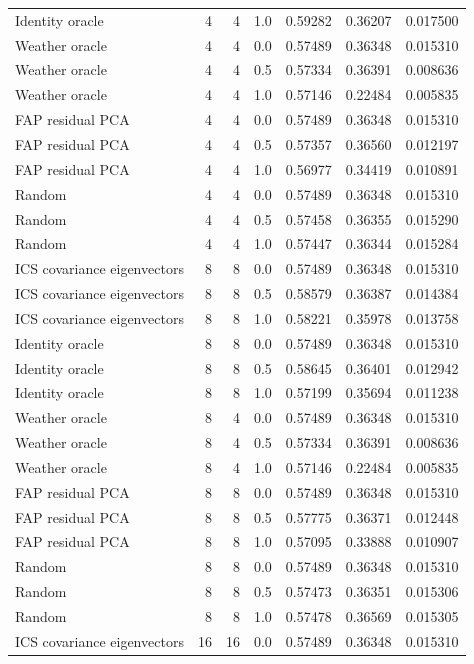 \begin{tabular}{lrrrrrr}
Identity oracle & 4 & 4 & 1.0 & 0.59282 & 0.36207 & 0.017500 \\
Weather oracle & 4 & 4 & 0.0 & 0.57489 & 0.36348 & 0.015310 \\
Weather oracle & 4 & 4 & 0.5 & 0.57334 & 0.36391 & 0.008636 \\
Weather oracle & 4 & 4 & 1.0 & 0.57146 & 0.22484 & 0.005835 \\
FAP residual PCA & 4 & 4 & 0.0 & 0.57489 & 0.36348 & 0.015310 \\
FAP residual PCA & 4 & 4 & 0.5 & 0.57357 & 0.36560 & 0.012197 \\
FAP residual PCA & 4 & 4 & 1.0 & 0.56977 & 0.34419 & 0.010891 \\
Random & 4 & 4 & 0.0 & 0.57489 & 0.36348 & 0.015310 \\
Random & 4 & 4 & 0.5 & 0.57458 & 0.36355 & 0.015290 \\
Random & 4 & 4 & 1.0 & 0.57447 & 0.36344 & 0.015284 \\
ICS covariance eigenvectors & 8 & 8 & 0.0 & 0.57489 & 0.36348 & 0.015310 \\
ICS covariance eigenvectors & 8 & 8 & 0.5 & 0.58579 & 0.36387 & 0.014384 \\
ICS covariance eigenvectors & 8 & 8 & 1.0 & 0.58221 & 0.35978 & 0.013758 \\
Identity oracle & 8 & 8 & 0.0 & 0.57489 & 0.36348 & 0.015310 \\
Identity oracle & 8 & 8 & 0.5 & 0.58645 & 0.36401 & 0.012942 \\
Identity oracle & 8 & 8 & 1.0 & 0.57199 & 0.35694 & 0.011238 \\
Weather oracle & 8 & 4 & 0.0 & 0.57489 & 0.36348 & 0.015310 \\
Weather oracle & 8 & 4 & 0.5 & 0.57334 & 0.36391 & 0.008636 \\
Weather oracle & 8 & 4 & 1.0 & 0.57146 & 0.22484 & 0.005835 \\
FAP residual PCA & 8 & 8 & 0.0 & 0.57489 & 0.36348 & 0.015310 \\
FAP residual PCA & 8 & 8 & 0.5 & 0.57775 & 0.36371 & 0.012448 \\
FAP residual PCA & 8 & 8 & 1.0 & 0.57095 & 0.33888 & 0.010907 \\
Random & 8 & 8 & 0.0 & 0.57489 & 0.36348 & 0.015310 \\
Random & 8 & 8 & 0.5 & 0.57473 & 0.36351 & 0.015306 \\
Random & 8 & 8 & 1.0 & 0.57478 & 0.36569 & 0.015305 \\
ICS covariance eigenvectors & 16 & 16 & 0.0 & 0.57489 & 0.36348 & 0.015310 \\

\end{tabular}
